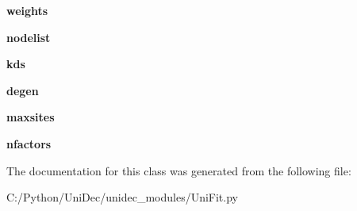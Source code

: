 \begin{DoxyCompactItemize}
\item 
\hypertarget{class_uni_dec_1_1unidec__modules_1_1_uni_fit_1_1kdstruct_a565d83d2bcf9999fce4a7c82edac5071}{}{\bfseries weights}\label{class_uni_dec_1_1unidec__modules_1_1_uni_fit_1_1kdstruct_a565d83d2bcf9999fce4a7c82edac5071}

\item 
\hypertarget{class_uni_dec_1_1unidec__modules_1_1_uni_fit_1_1kdstruct_a3cfb4623fb90233c1d7a54c58a5cb61c}{}{\bfseries nodelist}\label{class_uni_dec_1_1unidec__modules_1_1_uni_fit_1_1kdstruct_a3cfb4623fb90233c1d7a54c58a5cb61c}

\item 
\hypertarget{class_uni_dec_1_1unidec__modules_1_1_uni_fit_1_1kdstruct_a84f87f3e2f172496829d3c6795d41d28}{}{\bfseries kds}\label{class_uni_dec_1_1unidec__modules_1_1_uni_fit_1_1kdstruct_a84f87f3e2f172496829d3c6795d41d28}

\item 
\hypertarget{class_uni_dec_1_1unidec__modules_1_1_uni_fit_1_1kdstruct_a0407f0baa371307473be3457eaf8a436}{}{\bfseries degen}\label{class_uni_dec_1_1unidec__modules_1_1_uni_fit_1_1kdstruct_a0407f0baa371307473be3457eaf8a436}

\item 
\hypertarget{class_uni_dec_1_1unidec__modules_1_1_uni_fit_1_1kdstruct_abf1c0400b6e40e6feb54df5161d7bdbd}{}{\bfseries maxsites}\label{class_uni_dec_1_1unidec__modules_1_1_uni_fit_1_1kdstruct_abf1c0400b6e40e6feb54df5161d7bdbd}

\item 
\hypertarget{class_uni_dec_1_1unidec__modules_1_1_uni_fit_1_1kdstruct_aa5d62cacca8be8720cd50bc955bf3221}{}{\bfseries nfactors}\label{class_uni_dec_1_1unidec__modules_1_1_uni_fit_1_1kdstruct_aa5d62cacca8be8720cd50bc955bf3221}

\end{DoxyCompactItemize}


The documentation for this class was generated from the following file\+:\begin{DoxyCompactItemize}
\item 
C\+:/\+Python/\+Uni\+Dec/unidec\+\_\+modules/Uni\+Fit.\+py\end{DoxyCompactItemize}
